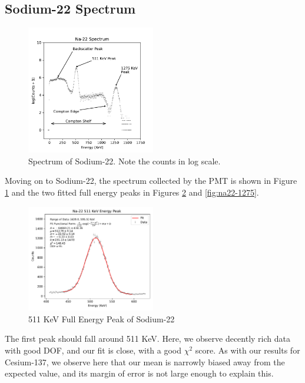 \documentclass[12pt, letterpaper]{article}
\begin{document}
\subsection{Sodium-22 Spectrum}

\begin{figure}[h]
    \centering
    \includegraphics[width=0.5\textwidth]{experiment1/figures/na22/spectrum.pdf}
    \caption{Spectrum of Sodium-22. Note the counts in log scale. }
    \label{fig:na22-spectrum}
\end{figure}

Moving on to Sodium-22, the spectrum collected by the PMT is shown in Figure \ref{fig:na22-spectrum} and the two fitted full energy peaks in Figures \ref{fig:na22-511} and \ref{fig:na22-1275}. 

\begin{figure}[h]
    \centering
    \includegraphics[width=0.5\textwidth]{experiment1/figures/na22/peak-511.pdf}
    \caption{511 KeV Full Energy Peak of Sodium-22}
    \label{fig:na22-511}
\end{figure}

The first peak should fall around 511 KeV. Here, we observe decently rich data with good DOF, and our fit is close, with a good $\chi^2$ score. As with our results for Cesium-137, we observe here that our mean is narrowly biased away from the expected value, and its margin of error is not large enough to explain this. 
\end{document}
